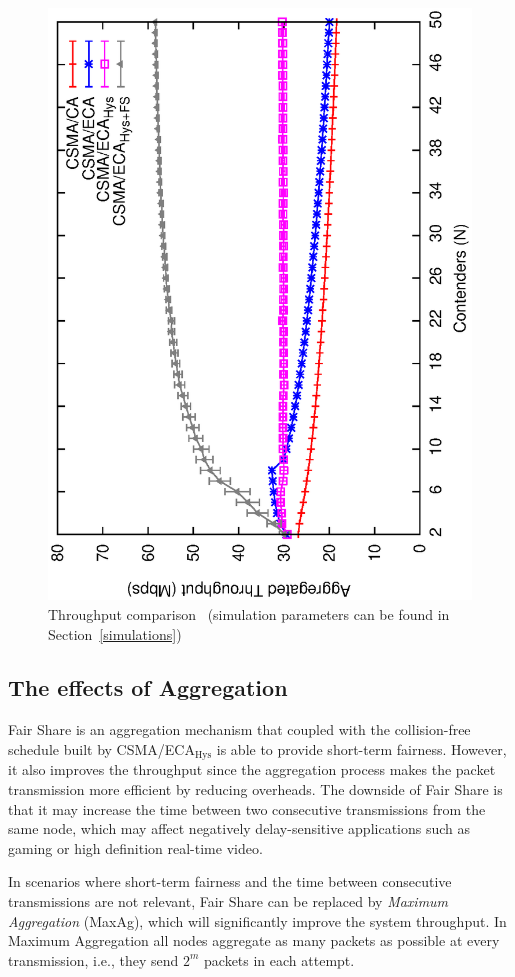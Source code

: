 \documentclass[a4paper,journal]{IEEEtran}
\begin{document}
	\begin{figure}[tb]
	\centering
		\includegraphics[width=0.7\linewidth,angle=-90]{figures/throughput-combined/throughput-combined.eps}
		\caption{Throughput comparison~\cite{research2standards} (simulation parameters can be found in Section~\ref{simulations})}
		\label{fig:ECA+H+F-throughput}
	\end{figure}


	\subsection{The effects of Aggregation}\label{effects-of-aggregation}
	Fair Share is an aggregation mechanism that coupled with the collision-free schedule built by CSMA/ECA$_{\text{Hys}}$ is able to provide short-term fairness. However, it also improves the throughput since the aggregation process makes the packet transmission more efficient by reducing overheads. The downside of Fair Share is that it may increase the time between two consecutive transmissions from the same node, which may affect negatively delay-sensitive applications such as gaming or high definition real-time video.
	
	In scenarios where short-term fairness and the time between consecutive transmissions are not relevant, Fair Share can be replaced by \emph{Maximum Aggregation} (MaxAg), which will significantly improve the system throughput. In Maximum Aggregation all nodes aggregate as many packets as possible at every transmission, i.e., they send $2^m$ packets in each attempt.
\end{document}
